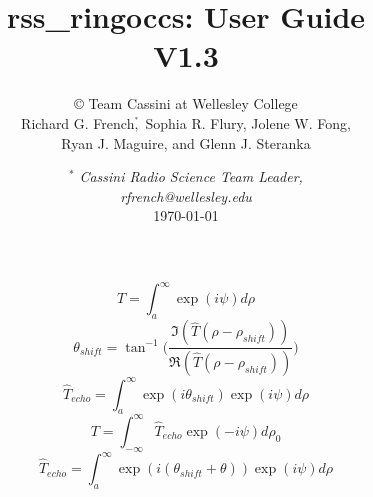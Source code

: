 \documentclass[titlepage, 12pt]{article}
\begin{document}
    \title{{\Huge{rss\_ringoccs: User Guide}\\}V1.3}
    \author{\copyright
            Team Cassini at Wellesley College\\
            Richard G. French$\overset{^*}{,}$
            Sophia R. Flury,
            Jolene W. Fong,\\
            Ryan J. Maguire, and
            Glenn J. Steranka}
    \date{%
        $^*$\textit{%
            \small{Cassini Radio Science Team Leader, \\
            rfrench@wellesley.edu}
        }\\[4ex]%
        \today%
    }
    \maketitle
    \newpage
    \tableofcontents
    \newpage
    \listoffigures
    \listoftables
    \clearpage
    \begin{equation}
        \hat{T}=\int_{a}^{\infty}\exp(i\psi)d\rho
    \end{equation}
    \begin{equation}
        \theta_{shift}=\tan^{-1}\Big(\frac{\Im(\hat{T}(\rho-\rho_{shift}))}{\Re(\hat{T}(\rho-\rho_{shift}))}\Big)
    \end{equation}
    \begin{equation}
        \hat{T}_{echo}=\int_{a}^{\infty}\exp(i\theta_{shift})\exp(i\psi)d\rho
    \end{equation}
    \begin{equation}
        T=\int_{-\infty}^{\infty}\hat{T}_{echo}\exp(-i\psi)d\rho_{0}
    \end{equation}
    \vspace{5ex}
    \begin{equation}
        \hat{T}_{echo}=\int_{a}^{\infty}\exp(i(\theta_{shift}+\theta))\exp(i\psi)d\rho
    \end{equation}
    \newpage
\end{document}
